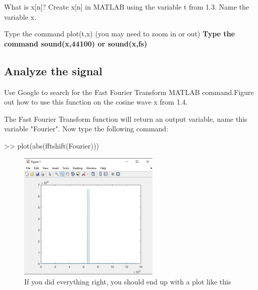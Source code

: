 \documentclass[11pt]{article}
\begin{document}
What is x[n]?\newline
Create x[n] in MATLAB using the variable t from 1.3. Name the variable x.\newline

\vspace{4mm}
Type the command plot(t,x)   (you may need to zoom in or out)\newline
\textbf{Type the command sound(x,44100) or sound(x,fs)}

\subsection{Analyze the signal}
Use Google to search for the Fast Fourier Transform MATLAB command.\newline Figure out how to use this function on the cosine wave x from 1.4.\newline

\vspace{3mm}

The Fast Fourier Transform function will return an output variable, name this variable "Fourier".\newline
Now type the following command:

\begin{center}

>> plot(abs(fftshift(Fourier)))

\end{center}

\vspace{80mm}
\begin{figure}[h]

\centering
\includegraphics[width=0.6\textwidth]{cosineFFTplot}
\caption {If you did everything right, you should end up with a plot like this}
\end{figure}
\end{document}

